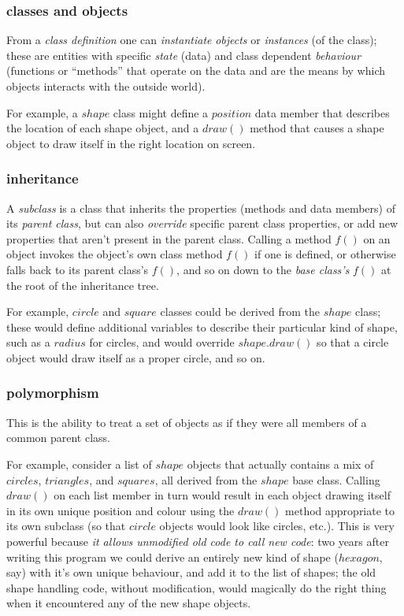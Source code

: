 \documentclass[12pt]{article}
\begin{document}
\subsubsection{classes and objects}


From a {\em class definition} one can {\em instantiate} {\em objects} or
{\em instances} (of the class); these are entities with specific {\em
state} (data) and class dependent {\em behaviour} (functions or
``methods'' that operate on the data and are the means by which objects
interacts with the outside world).    

For example, a $shape$ class might define a $position$ data member that
describes the location of each shape object, and a $draw()$ method that
causes a shape object to draw itself in the right location on screen.

\subsubsection{inheritance}

A {\em subclass} is a class that inherits the properties (methods and
data members) of its {\em parent class}, but can also {\em override}
specific parent class properties, or add new properties that aren't
present in the parent class. Calling a method $f()$ on an object invokes
the object's own class method $f()$ if one is defined, or otherwise
falls back to its parent class's $f()$, and so on down to the {\em
base class's} $f()$ at the root of the inheritance tree. 

For example, $circle$ and $square$ classes could be derived from the
$shape$ class; these would define additional variables to describe their
particular kind of shape, such as a $radius$ for circles, and would
override $shape.draw()$ so that a circle object would draw itself as a
proper circle, and so on.


\subsubsection{polymorphism}

This is the ability to treat a set of objects as if they were
all members of a common parent class.

For example, consider a list of $shape$ objects that actually contains a
mix of $circles$, $triangles$, and $squares$, all derived from the
$shape$ base class.  Calling $draw()$ on each list member in turn would
result in each object drawing itself in its own unique position and
colour using the $draw()$ method appropriate to its own subclass (so
that $circle$ objects would look like circles, etc.). This is very
powerful because {\em it allows unmodified old code to call new code}:
two years after writing this program we could derive an entirely new
kind of shape ($hexagon$, say) with it's own unique behaviour, and add
it to the list of shapes; the old shape handling code, without
modification, would magically do the right thing when it encountered any
of the new shape objects.
\end{document}
